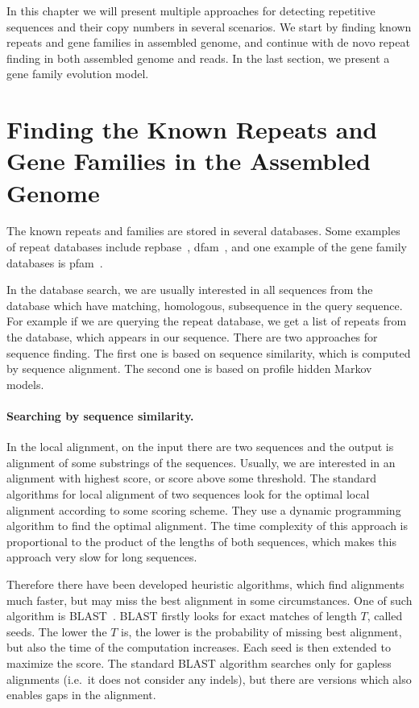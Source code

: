 In this chapter we will present multiple approaches for detecting repetitive sequences and their copy numbers in several scenarios. We start by finding known repeats and gene families in assembled genome, and continue with de novo repeat finding in both assembled genome and reads. In the last section, we present a gene family evolution model.

\section[Known Repeats in Assem\dots]{Finding the Known Repeats and Gene Families in the Assembled Genome}

The known repeats and families are stored in several databases. Some examples of repeat databases include repbase~\cite{repbase}, dfam~\cite{dfam}, and one example of the gene family databases is pfam~\cite{pfam}.

In the database search, we are usually interested in all  sequences from the database which have matching, homologous, subsequence in the query sequence. For example if we are querying the repeat database, we get a list of repeats from the database, which appears in our sequence.
There are two approaches for sequence finding. The first one is based on sequence similarity, which is computed by sequence alignment. The second one is based on profile hidden Markov models.

\paragraph{Searching by sequence similarity.}
In the local alignment, on the input there are two sequences and the output is alignment of some substrings of the sequences. Usually, we are interested in an alignment with highest score, or score above some threshold.
The standard algorithms for local alignment of two sequences look for the optimal local alignment according to some scoring scheme. They use a dynamic programming algorithm to find the optimal alignment. The time complexity of this approach is proportional to the product of the lengths of both sequences, which makes this approach very slow for long sequences.

Therefore there have been developed heuristic algorithms, which find alignments much faster, but may miss the best alignment in some circumstances. One of such algorithm is BLAST~\cite{blast}.
BLAST firstly looks for exact matches of length $T$, called seeds. The lower the $T$ is, the lower is the probability of missing best alignment, but also the time of the computation increases.
Each seed is then extended to maximize the score. The standard BLAST algorithm searches only for gapless alignments (i.e.\ it does not consider any indels), but there are versions which also enables gaps in the alignment.

